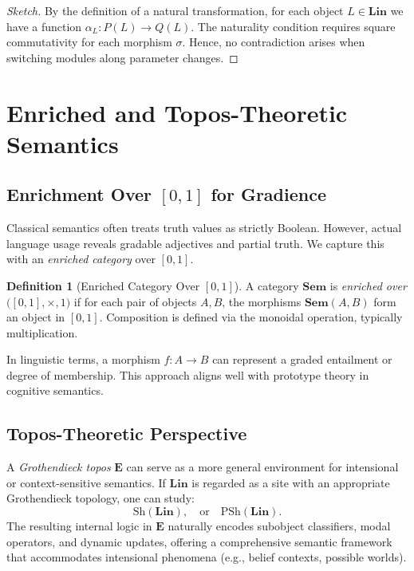 \documentclass[12pt]{article}
\theoremstyle{plain}
\theoremstyle{definition}
\newtheorem{definition}[theorem]{Definition}
\begin{document}
\begin{proof}[Sketch]
By the definition of a natural transformation, for each object \(L\in \mathbf{Lin}\) we have a function \(\alpha_L: P(L) \to Q(L)\). The naturality condition requires square commutativity for each morphism \(\sigma\). Hence, no contradiction arises when switching modules along parameter changes.
\end{proof}

\section{Enriched and Topos-Theoretic Semantics}

\subsection{Enrichment Over \texorpdfstring{$[0,1]$}{[0,1]} for Gradience}
Classical semantics often treats truth values as strictly Boolean. However, actual language usage reveals gradable adjectives and partial truth. We capture this with an \emph{enriched category} over \([0,1]\).

\begin{definition}[Enriched Category Over \texorpdfstring{$[0,1]$}{[0,1]}]
A category \(\mathbf{Sem}\) is \emph{enriched over} \(\bigl([0,1], \times, 1\bigr)\) if for each pair of objects \(A, B\), the morphisms \(\mathbf{Sem}(A,B)\) form an object in \([0,1]\). Composition is defined via the monoidal operation, typically multiplication.
\end{definition}

In linguistic terms, a morphism \(f: A \to B\) can represent a graded entailment or degree of membership. This approach aligns well with prototype theory in cognitive semantics.

\subsection{Topos-Theoretic Perspective}
A \emph{Grothendieck topos} \(\mathbf{E}\) can serve as a more general environment for intensional or context-sensitive semantics. If \(\mathbf{Lin}\) is regarded as a site with an appropriate Grothendieck topology, one can study:
\[
\mathrm{Sh}(\mathbf{Lin}), \quad\text{or}\quad \mathrm{PSh}(\mathbf{Lin}).
\]
The resulting internal logic in \(\mathbf{E}\) naturally encodes subobject classifiers, modal operators, and dynamic updates, offering a comprehensive semantic framework that accommodates intensional phenomena (e.g., belief contexts, possible worlds).
\end{document}
